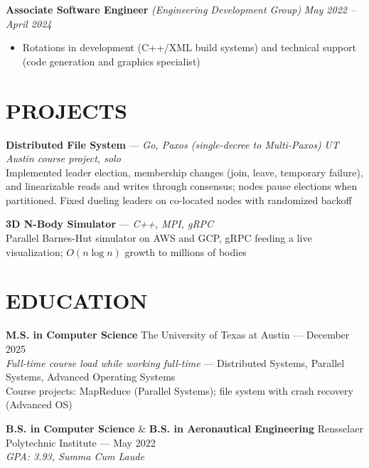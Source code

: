 \documentclass{article}
\begin{document}
{\large \textbf{Associate Software Engineer}} \textit{(Engineering Development Group)} \hfill \textit{May 2022 -- April 2024}
\begin{itemize}[leftmargin=*]
    \item Rotations in development (C++/XML build systems) and technical support (code generation and graphics specialist)
\end{itemize}

\section*{PROJECTS}
\textbf{Distributed File System} — \textit{Go, Paxos (single-decree to Multi-Paxos)} \hfill \textit{UT Austin course project, solo} \\
Implemented leader election, membership changes (join, leave, temporary failure), and linearizable reads and writes through consensus; nodes pause elections when partitioned. Fixed dueling leaders on co-located nodes with randomized backoff

\textbf{3D N-Body Simulator} — \textit{C++, MPI, gRPC} \\
Parallel Barnes-Hut simulator on AWS and GCP, gRPC feeding a live visualization; $O(n \log n)$ growth to millions of bodies

\section*{EDUCATION}
\textbf{M.S. in Computer Science} \hfill The University of Texas at Austin — December 2025 \\
\textit{Full-time course load while working full-time} — Distributed Systems, Parallel Systems, Advanced Operating Systems \\
Course projects: MapReduce (Parallel Systems); file system with crash recovery (Advanced OS)

\textbf{B.S. in Computer Science} \& \textbf{B.S. in Aeronautical Engineering} \hfill Rensselaer Polytechnic Institute — May 2022 \\
\textit{GPA: 3.93, Summa Cum Laude}
\end{document}

